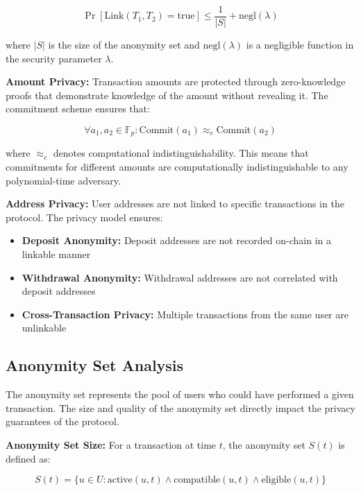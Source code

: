 \documentclass[11pt,a4paper]{article}
\begin{document}
\begin{equation}
\Pr[\text{Link}(T_1, T_2) = \text{true}] \leq \frac{1}{|S|} + \text{negl}(\lambda)
\end{equation}

where $|S|$ is the size of the anonymity set and $\text{negl}(\lambda)$ is a negligible function in the security parameter $\lambda$.

\textbf{Amount Privacy:}
Transaction amounts are protected through zero-knowledge proofs that demonstrate knowledge of the amount without revealing it. The commitment scheme ensures that:

\begin{equation}
\forall a_1, a_2 \in \mathbb{F}_p: \text{Commit}(a_1) \approx_c \text{Commit}(a_2)
\end{equation}

where $\approx_c$ denotes computational indistinguishability. This means that commitments for different amounts are computationally indistinguishable to any polynomial-time adversary.

\textbf{Address Privacy:}
User addresses are not linked to specific transactions in the protocol. The privacy model ensures:

\begin{itemize}
    \item \textbf{Deposit Anonymity:} Deposit addresses are not recorded on-chain in a linkable manner
    \item \textbf{Withdrawal Anonymity:} Withdrawal addresses are not correlated with deposit addresses
    \item \textbf{Cross-Transaction Privacy:} Multiple transactions from the same user are unlinkable
\end{itemize}

\subsection{Anonymity Set Analysis}

The anonymity set represents the pool of users who could have performed a given transaction. The size and quality of the anonymity set directly impact the privacy guarantees of the protocol.

\textbf{Anonymity Set Size:}
For a transaction at time $t$, the anonymity set $S(t)$ is defined as:

\begin{equation}
S(t) = \{u \in U : \text{active}(u, t) \land \text{compatible}(u, t) \land \text{eligible}(u, t)\}
\end{equation}
\end{document}
